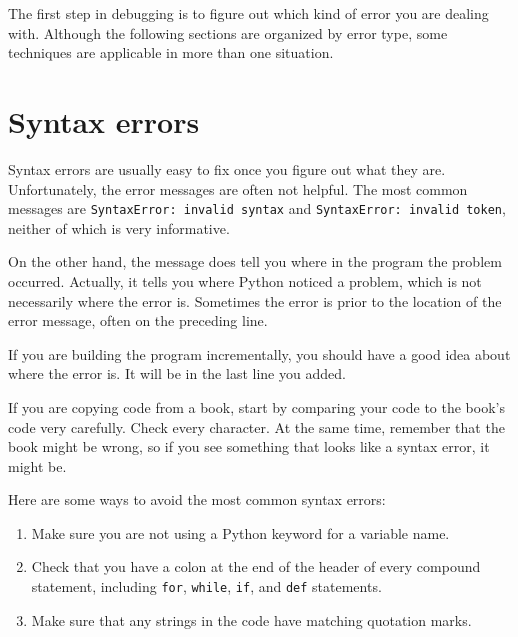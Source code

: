 \documentclass[10pt]{book}
\begin{document}
{The first step in debugging is to figure out which kind of
error you are dealing with.  Although the following sections are
organized by error type, some techniques are
applicable in more than one situation.


\section{Syntax errors}


Syntax errors are usually easy to fix once you figure out what they
are.  Unfortunately, the error messages are often not helpful.
The most common messages are {\tt SyntaxError: invalid syntax} and
{\tt SyntaxError: invalid token}, neither of which is very informative.

On the other hand, the message does tell you where in the program the
problem occurred.  Actually, it tells you where Python
noticed a problem, which is not necessarily where the error
is.  Sometimes the error is prior to the location of the error
message, often on the preceding line.


If you are building the program incrementally, you should have
a good idea about where the error is.  It will be in the last
line you added.

If you are copying code from a book, start by comparing
your code to the book's code very carefully.  Check every character.
At the same time, remember that the book might be wrong, so
if you see something that looks like a syntax error, it might be.

Here are some ways to avoid the most common syntax errors:


\begin{enumerate}

\item Make sure you are not using a Python keyword for a variable name.


\item Check that you have a colon at the end of the header of every
compound statement, including {\tt for}, {\tt while},
{\tt if}, and {\tt def} statements.


\item Make sure that any strings in the code have matching
quotation marks.


\end{enumerate}}
\end{document}
